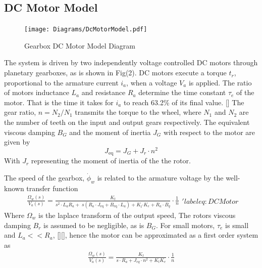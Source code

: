     \subsection{DC Motor Model}    
    \begin{figure}[H]
        \centering
            \texttt{[image: Diagrams/DcMotorModel.pdf]}
        \caption{Gearbox DC Motor Model Diagram}
    \end{figure}
    The system is driven by two independently voltage controlled DC motors through 
    planetary gearboxes, as is shown in Fig(2). 
    DC motors execute a torque $t_r$, proportional to the armature current $i_a$,
    when a voltage $V_a$ is applied.
    The ratio of motors inductance $L_a$ and resistance $R_a$ determine the
    time constant $\tau_e$ of the motor. That is the time it takes 
    for $i_a$ to reach 63.2\% of its final value. []
    The gear ratio, $n=N_2/N_1$ transmits the torque to the wheel, 
    where $N_1$ and $N_2$ are the number of teeth on the input and output gears respectively.
    The equivalent viscous damping 
    $B_G$ and the moment of inertia $J_G$ with respect to the motor are given by
    \begin{equation}
        J_{\text{eq}} = J_G + J_r \cdot n^2 
    \end{equation}
    With $J_r$ representing the moment of inertia of the the rotor.

    The speed of the gearbox, $\dot\phi_w$ is related to the armature voltage 
    by the well-known transfer function
    \begin{equation}
        \begin{aligned}
            \frac{\Omega_w \left(s\right)}{V_a \left(s\right)}=\frac{K_t }{s^2 \cdot L_a R_a +\;s\left(R_a \cdot J_{\mathrm{eq}} +B_{\mathrm{eq}} \cdot L_a \right)+K_t {\cdot K}_e +R_a \cdot B_q }\cdot\frac{1}{n}
        \end{aligned}
        'label{eq:DCMotor}
    \end{equation}
    Where $\Omega_w$ is the laplace transform of the output speed, 
    The rotors viscous damping $B_r$ is assumed to be negligible, as is $B_G$. 
    For small motors, $\tau_e$ is small and $L_a << R_a$, [][], hence the motor can be 
    approximated as a first order system as
    \begin{equation}
        \begin{aligned}
            \frac{\Omega_w \left(s\right)}{V_a \left(s\right)}=\frac{K_t }{s\cdot R_a + J_{eq}\cdot n^2+K_t K_e }\cdot\frac{1}{n}
        \end{aligned}
        \label{eq:DCMotorSimple}
    \end{equation}

